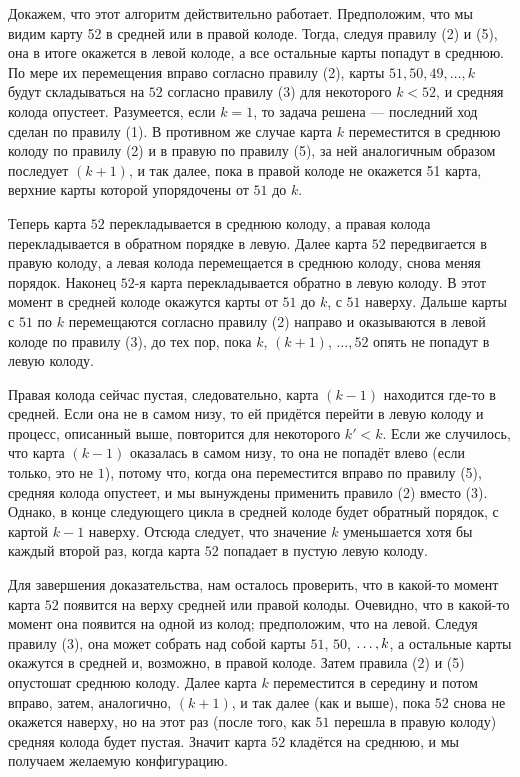 Докажем, что этот алгоритм действительно работает.
Предположим, что мы видим карту 52 в средней или в правой колоде.
Тогда, следуя правилу (2) и (5), она в итоге окажется в левой колоде, а все остальные карты попадут в среднюю.
По мере их перемещения вправо согласно правилу (2), карты $51, 50, 49, \dots, k$ будут складываться на $52$ согласно правилу (3) для некоторого $k < 52$, и средняя колода опустеет.
Разумеется, если $k = 1$, то задача решена --- последний ход сделан по правилу (1).
В противном же случае карта $k$ переместится в среднюю колоду по правилу (2) и в правую по правилу (5), за ней аналогичным образом последует $(k+1)$, и так далее, пока в правой колоде не окажется 51 карта, верхние карты которой упорядочены от $51$ до $k$.

Теперь карта $52$ перекладывается в среднюю колоду,
а правая колода перекладывается в обратном порядке в левую.
Далее карта $52$ передвигается в правую колоду, а левая колода перемещается в среднюю колоду, снова меняя порядок.
Наконец $52$-я карта перекладывается обратно в левую колоду.
В этот момент в средней колоде окажутся карты от $51$ до $k$, с $51$ наверху.
Дальше карты с $51$ по $k$ перемещаются согласно правилу (2) направо и оказываются в левой колоде по правилу (3), до тех пор, пока $k$, $(k+1)$, $\dots, 52$ опять не попадут в левую колоду.

Правая колода сейчас пустая, следовательно,  карта $(k-1)$ находится где-то в средней.
Если она не в самом низу, то ей придётся перейти в левую колоду и процесс, описанный выше, повторится для некоторого $k'<k$.
Если же случилось, что карта $(k-1)$ оказалась в самом низу, то она не попадёт влево (если только, это не $1$), потому что, когда она переместится вправо по правилу (5), средняя колода опустеет, и мы вынуждены применить правило (2) вместо (3).
Однако, в конце следующего цикла в средней колоде будет обратный порядок, с картой $k-1$ наверху.
Отсюда следует, что значение $k$ уменьшается хотя бы каждый второй раз, когда карта $52$ попадает в пустую левую колоду.

Для завершения доказательства, нам осталось проверить, что в какой-то момент карта $52$ появится на верху средней или правой колоды.
Очевидно, что в какой-то момент она появится на одной из колод;
предположим, что на левой.
Следуя правилу (3), она может собрать над собой карты $51$, $50$, $\z\dots, k$, а остальные карты окажутся в средней и, возможно, в правой колоде.
Затем правила (2) и (5) опустошат среднюю колоду.
Далее карта $k$ переместится в середину и потом вправо, затем, аналогично, $(k+1)$, и так далее (как и выше), пока $52$ снова не окажется наверху, но на этот раз (после того, как $51$ перешла в правую колоду) средняя колода будет пустая.
Значит карта $52$ кладётся на среднюю, и мы получаем желаемую конфигурацию.


